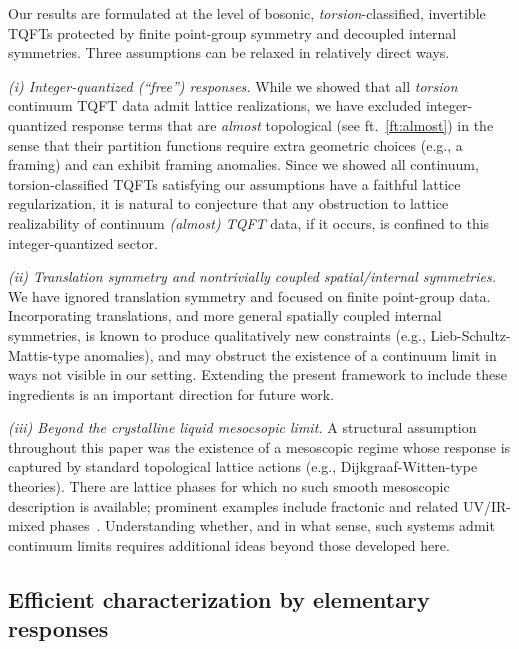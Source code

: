 \documentclass[aps,prx,reprint,superscriptaddress,twocolumn,amsmath,amssymb,amsfonts, nofootinbib]{revtex4-2}
\theoremstyle{apsstyle}
\begin{document}
Our results are formulated at the level of bosonic, \emph{torsion}-classified, invertible TQFTs protected by finite point-group symmetry and decoupled internal symmetries. Three assumptions can be relaxed in relatively direct ways.

\smallskip

\noindent \textit{(i) Integer-quantized (“free”) responses.} While we showed that all \emph{torsion} continuum TQFT data admit lattice realizations, we have excluded integer-quantized response terms that are \emph{almost} topological (see ft.~\ref{ft:almost}) in the sense that their partition functions require extra geometric choices (e.g., a framing) and can exhibit framing anomalies. Since we showed all continuum, torsion-classified TQFTs satisfying our assumptions have a faithful lattice regularization, it is natural to conjecture that any obstruction to lattice realizability of continuum \emph{(almost) TQFT} data, if it occurs, is confined to this integer-quantized sector.

\smallskip

\noindent \textit{(ii) Translation symmetry and nontrivially coupled spatial/internal symmetries.} We have ignored translation symmetry and focused on finite point-group data. Incorporating translations, and more general spatially coupled internal symmetries, is known to produce qualitatively new constraints (e.g., Lieb-Schultz-Mattis-type anomalies), and may obstruct the existence of a continuum limit in ways not visible in our setting. Extending the present framework to include these ingredients is an important direction for future work.

\smallskip

\noindent \textit{(iii) Beyond the crystalline liquid mesocsopic limit.} A structural assumption throughout this paper was the existence of a mesoscopic regime whose response is captured by standard topological lattice actions (e.g., Dijkgraaf-Witten-type theories). There are lattice phases for which no such smooth mesoscopic description is available; prominent examples include fractonic and related UV/IR-mixed phases~\cite{ShirleySlagleChen2019,DuaSarkarWilliamsonCheng2020,Slagle2021FQFT,GorantlaLamSeibergShao2021}. Understanding whether, and in what sense, such systems admit continuum limits requires additional ideas beyond those developed here.








\subsection{Efficient characterization by elementary responses}
\label{sec:efficient_response_characterization}
\end{document}
